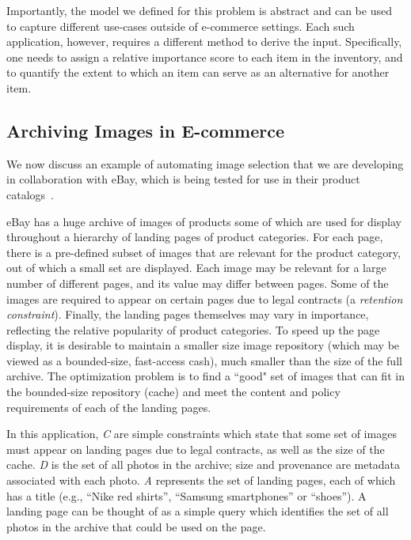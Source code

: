 \documentclass[11pt,dvipdfm]{article}
\begin{document}
Importantly, the model we defined for this problem is abstract and can be used to capture different use-cases outside of e-commerce settings. 
Each such application, however, requires a different method to derive the input. Specifically, one needs to assign a relative importance score to each item in the inventory, and to quantify the extent to which an item can serve as an alternative for another item. 



\subsection{Archiving Images in E-commerce}
\label{ssec: photos}

We now discuss an example of automating image selection that we are developing in collaboration with eBay, which is being tested for use in their product catalogs~\cite{SIGMOD-demo}. 

eBay has a huge archive of images of products some of which are used for display throughout a hierarchy of landing pages of product categories. For each page, there is a pre-defined subset of images that are relevant for the product category, out of which 
a small set are displayed.  
Each image may be relevant for a large number of different pages, and its value may differ between pages. 
Some of the images are required to appear on certain pages due to legal contracts (a {\em retention constraint}).  Finally, the landing pages themselves may vary in importance, reflecting the relative popularity of product categories.
To speed up the page display, it is desirable to maintain a smaller size image repository (which may be viewed as a bounded-size, fast-access cash), much smaller than the size of the full archive.  The optimization problem is to find a ``good" set of images that can fit in the bounded-size repository (cache) and meet the content and policy requirements of each of the landing pages.

In this application, \textit{C} are simple constraints which state that some set of images must appear on landing pages due to legal contracts, as well as the size of the cache.  
\textit{D} is the set of all photos in the archive; size and provenance are metadata associated with each photo.
\textit{A} represents the set of landing pages, each of which has a title (e.g., ``Nike red shirts'', ``Samsung smartphones'' or ``shoes'').  A landing page can be thought of as a simple query which identifies the set of all photos in the archive that could be used on the page. 
\end{document}
